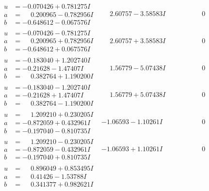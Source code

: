 \documentclass[1p]{elsarticle_modified}
\theoremstyle{definition}
\begin{document}
$$\begin{array}{c|c|c}
\begin{aligned}
u &= -0.070426 + 0.781275 I \\
a &= \phantom{-}0.200965 - 0.782956 I \\
b &= -0.648612 - 0.067576 I\end{aligned}
 & \phantom{-}2.60757 - 3.58583 I & \phantom{-0.000000 } 0 \\ \hline\begin{aligned}
u &= -0.070426 - 0.781275 I \\
a &= \phantom{-}0.200965 + 0.782956 I \\
b &= -0.648612 + 0.067576 I\end{aligned}
 & \phantom{-}2.60757 + 3.58583 I & \phantom{-0.000000 } 0 \\ \hline\begin{aligned}
u &= -0.183040 + 1.202740 I \\
a &= -0.21628 - 1.47407 I \\
b &= \phantom{-}0.382764 + 1.190200 I\end{aligned}
 & \phantom{-}1.56779 - 5.07438 I & \phantom{-0.000000 } 0 \\ \hline\begin{aligned}
u &= -0.183040 - 1.202740 I \\
a &= -0.21628 + 1.47407 I \\
b &= \phantom{-}0.382764 - 1.190200 I\end{aligned}
 & \phantom{-}1.56779 + 5.07438 I & \phantom{-0.000000 } 0 \\ \hline\begin{aligned}
u &= \phantom{-}1.209210 + 0.230205 I \\
a &= -0.872059 + 0.432961 I \\
b &= -0.197040 - 0.810735 I\end{aligned}
 & -1.06593 - 1.10261 I & \phantom{-0.000000 } 0 \\ \hline\begin{aligned}
u &= \phantom{-}1.209210 - 0.230205 I \\
a &= -0.872059 - 0.432961 I \\
b &= -0.197040 + 0.810735 I\end{aligned}
 & -1.06593 + 1.10261 I & \phantom{-0.000000 } 0 \\ \hline\begin{aligned}
u &= \phantom{-}0.896049 + 0.853495 I \\
a &= \phantom{-}0.41426 - 1.53788 I \\
b &= \phantom{-}0.341377 + 0.982621 I\end{aligned}

\end{array}$$
\end{document}
